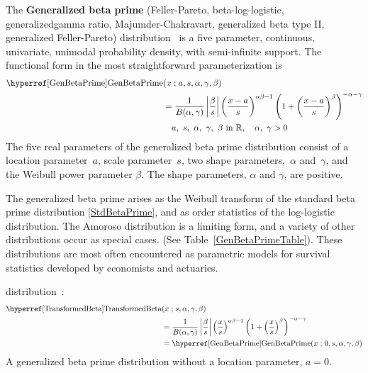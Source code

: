 

\label{sec:GenBetaPrime}
{} 
The {\bf Generalized beta prime} (Feller-Pareto, beta-log-logistic, generalized\linebreak gamma ratio, Majumder-Chakravart, generalized beta type II, generalized Feller-Pareto)  distribution~\cite{Feller1971, McDonald1984, Tahmasebi2010} is a five parameter,  continuous, univariate, unimodal probability density, with semi-infinite support. The functional form in the most straightforward parameterization is
\begin{align}
\label{GenBetaPrime}
\opr{GenBetaPrime}&(x\given a, s, \alpha,\gamma,\beta) \\
& =
 \frac{1}{B(\alpha, \gamma)} \left|\frac{\beta}{s}\right|
\left(\frac{x-a}{s}\right)^{\alpha\beta -1} \left(1+ \left(\frac{x-a}{s}\right)^\beta \right)^{-\alpha-\gamma }
\notag
\checked
\\ & \quad a,\ s,\ \alpha,\ \gamma,\ \beta \text{ in } \mathbb{R},\quad  \alpha,\ \gamma >0
\notag
\end{align}
The five real parameters of the generalized beta prime distribution consist of a location parameter~$a$, 
scale parameter~$s$, two shape parameters,~$\alpha$ and~$\gamma$, and the Weibull power parameter $\beta$. The shape parameters, $\alpha$ and $\gamma$, are positive.


The generalized beta prime arises as the Weibull transform of the standard beta prime distribution \eqref{StdBetaPrime}, and as order statistics of the log-logistic distribution. The Amoroso distribution is a limiting form, and a variety of other distributions occur as special cases. (See Table~\ref{GenBetaPrimeTable}).  These distributions are most often encountered as parametric models for survival statistics developed by  economists and actuaries.







 distribution~\cite{McDonald1984,Klugman2012}:
\begin{align}
\label{TransformedBeta}
\opr{TransformedBeta}&(x\given s, \alpha,\gamma,\beta) 
\\ \notag & =
 \frac{1}{B(\alpha, \gamma)} \left|\frac{\beta}{s}\right|
\left(\frac{x}{s}\right)^{\alpha\beta -1} \left(1+ \left(\frac{x}{s}\right)^\beta \right)^{-\alpha-\gamma }
\checked
\\ \notag &= \opr{GenBetaPrime}(x\given 0, s, \alpha,\gamma,\beta) 
\checked
\end{align}
A generalized beta prime distribution without a location parameter, $a=0$.


